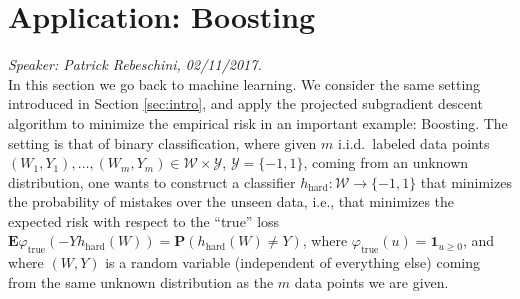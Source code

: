 
\chapter{Application: Boosting}

\emph{Speaker: Patrick Rebeschini, 02/11/2017.}\\

In this section we go back to machine learning. We consider the same setting introduced in Section \ref{sec:intro}, and apply the projected subgradient descent algorithm to minimize the empirical risk in an important example: Boosting. The setting is that of binary classification, where given $m$ i.i.d.\ labeled data points $(W_1,Y_1),\ldots,(W_m,Y_m)\in\mathcal{W}\times\mathcal{Y}$, $\mathcal{Y}=\{-1,1\}$, coming from an unknown distribution, one wants to construct a classifier $h_\text{hard}:\mathcal{W} \rightarrow \{-1,1\}$ that minimizes the probability of mistakes over the unseen data, i.e., that minimizes the expected risk with respect to the ``true'' loss $\mathbf{E} \varphi_\text{true}(-Yh_\text{hard}(W))=\mathbf{P} (h_\text{hard}(W)\neq Y)$, where $\varphi_\text{true}(u) = \mathbf{1}_{u\ge 0}$, and where $(W,Y)$ is a random variable (independent of everything else) coming from the same unknown distribution as the $m$ data points we are given.

